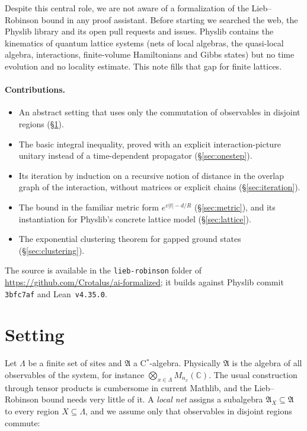 \documentclass[11pt]{article}
\theoremstyle{definition}
\theoremstyle{remark}
\newcommand{\fA}{\mathfrak{A}}
\begin{document}
Despite this central role, we are not aware of a formalization of the Lieb--Robinson bound in any
proof assistant. Before starting we searched the web, the Physlib library
\cite{toobysmith2024heplean} and its open pull requests and issues. Physlib contains the
kinematics of quantum lattice systems (nets of local algebras, the quasi-local algebra,
interactions, finite-volume Hamiltonians and Gibbs states) but no time evolution and no locality
estimate. This note fills that gap for finite lattices.

\paragraph{Contributions.}
\begin{itemize}
  \item An abstract setting that uses only the commutation of observables in disjoint regions
  (\S\ref{sec:setting}).
  \item The basic integral inequality, proved with an explicit interaction-picture unitary
  instead of a time-dependent propagator (\S\ref{sec:onestep}).
  \item Its iteration by induction on a recursive notion of distance in the overlap graph of the
  interaction, without matrices or explicit chains (\S\ref{sec:iteration}).
  \item The bound in the familiar metric form $e^{v|t|-d/R}$ (\S\ref{sec:metric}), and its
  instantiation for Physlib's concrete lattice model (\S\ref{sec:lattice}).
  \item The exponential clustering theorem for gapped ground states (\S\ref{sec:clustering}).
\end{itemize}

The source is available in the \texttt{lieb-robinson} folder of
\url{https://github.com/Crotalus/ai-formalized}; it builds against Physlib commit \texttt{3bfc7af}
and Lean~\texttt{v4.35.0}.

\section{Setting}\label{sec:setting}

Let $\Lambda$ be a finite set of sites and $\fA$ a C$^*$-algebra. Physically $\fA$ is the algebra
of all observables of the system, for instance $\bigotimes_{x\in\Lambda}M_{n_x}(\mathbb C)$. The
usual construction through tensor products is cumbersome in current Mathlib, and the
Lieb--Robinson bound needs very little of it. A \emph{local net} assigns a subalgebra
$\fA_X\subseteq\fA$ to every region $X\subseteq\Lambda$, and we assume only that observables in
disjoint regions commute:
\end{document}
